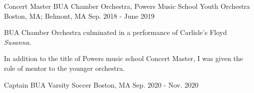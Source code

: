 \begin{cventries}
\cventry
    {Concert Master}
    {BUA Chamber Orchestra, Powers Music School Youth Orchestra}
    {Boston, MA; Belmont, MA}
    {Sep. 2018 - June 2019}
    {
        \begin{cvitems}
            \item {BUA Chamber Orchestra culminated in a performance of Carlisle's Floyd \textit{Susanna}.}
            \item{In addition to the title of Powers music school Concert Master, I was given the role of mentor to the younger orchestra.}
        \end{cvitems}
    }
    
  \cventry
    {Captain} %
    {BUA Varsity Soccer} %
    {Boston, MA} %
    {Sep. 2020 - Nov. 2020} %
    {
      \begin{cvitems} %
      \end{cvitems}
    }

\end{cventries}



